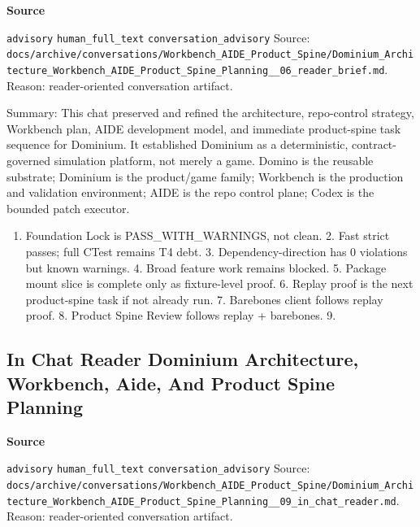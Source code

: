 \documentclass[9pt,a4paper,openany]{book}
\newcommand{\vonecallout}[3]{\par\medskip\noindent\begingroup\setlength{\fboxsep}{7pt}\colorbox{DomCalloutBg}{\parbox{0.94\linewidth}{\textbf{\textcolor{#1}{#2}}\par #3}}\endgroup\par\medskip}
\begin{document}
\vonecallout{DomSlate}{Source}{\texttt{advisory} \texttt{human\_\allowbreak{}full\_\allowbreak{}text} \texttt{conversation\_\allowbreak{}advisory} Source: \texttt{docs/\allowbreak{}archive/\allowbreak{}conversations/\allowbreak{}Workbench\_\allowbreak{}AIDE\_\allowbreak{}Product\_\allowbreak{}Spine/\allowbreak{}Dominium\_\allowbreak{}Architecture\_\allowbreak{}Workbench\_\allowbreak{}AIDE\_\allowbreak{}Product\_\allowbreak{}Spine\_\allowbreak{}Planning\_\allowbreak{}\_\allowbreak{}06\_\allowbreak{}reader\_\allowbreak{}brief.\allowbreak{}md}.\allowbreak{} Reason: reader-\allowbreak{}oriented conversation artifact.\allowbreak{}}

Summary: This chat preserved and refined the architecture, repo-\allowbreak{}control strategy, Workbench plan, AIDE development model, and immediate product-\allowbreak{}spine task sequence for Dominium.\allowbreak{} It established Dominium as a deterministic, contract-\allowbreak{}governed simulation platform, not merely a game.\allowbreak{} Domino is the reusable substrate; Dominium is the product/\allowbreak{}game family; Workbench is the production and validation environment; AIDE is the repo control plane; Codex is the bounded patch executor.\allowbreak{}


\begin{enumerate}
\item Foundation Lock is PASS\_\allowbreak{}WITH\_\allowbreak{}WARNINGS, not clean.\allowbreak{} 2.\allowbreak{} Fast strict passes; full CTest remains T4 debt.\allowbreak{} 3.\allowbreak{} Dependency-\allowbreak{}direction has 0 violations but known warnings.\allowbreak{} 4.\allowbreak{} Broad feature work remains blocked.\allowbreak{} 5.\allowbreak{} Package mount slice is complete only as fixture-\allowbreak{}level proof.\allowbreak{} 6.\allowbreak{} Replay proof is the next product-\allowbreak{}spine task if not already run.\allowbreak{} 7.\allowbreak{} Barebones client follows replay proof.\allowbreak{} 8.\allowbreak{} Product Spine Review follows replay + barebones.\allowbreak{} 9.\allowbreak{}
\end{enumerate}


\subsection{In Chat Reader Dominium Architecture, Workbench, Aide, And Product Spine Planning}

\vonecallout{DomSlate}{Source}{\texttt{advisory} \texttt{human\_\allowbreak{}full\_\allowbreak{}text} \texttt{conversation\_\allowbreak{}advisory} Source: \texttt{docs/\allowbreak{}archive/\allowbreak{}conversations/\allowbreak{}Workbench\_\allowbreak{}AIDE\_\allowbreak{}Product\_\allowbreak{}Spine/\allowbreak{}Dominium\_\allowbreak{}Architecture\_\allowbreak{}Workbench\_\allowbreak{}AIDE\_\allowbreak{}Product\_\allowbreak{}Spine\_\allowbreak{}Planning\_\allowbreak{}\_\allowbreak{}09\_\allowbreak{}in\_\allowbreak{}chat\_\allowbreak{}reader.\allowbreak{}md}.\allowbreak{} Reason: reader-\allowbreak{}oriented conversation artifact.\allowbreak{}}
\end{document}
